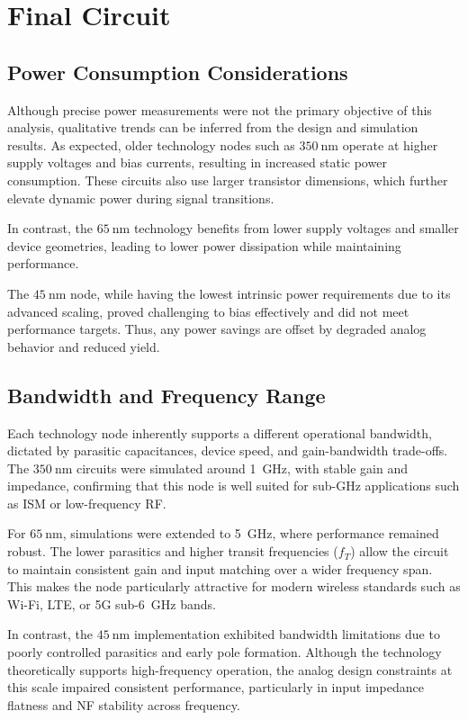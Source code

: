 \section{Final Circuit}

\subsection{Power Consumption Considerations}

Although precise power measurements were not the primary objective of this analysis, qualitative trends can be inferred from the design and simulation results. As expected, older technology nodes such as $\SI{350}{\nano \meter}$ operate at higher supply voltages and bias currents, resulting in increased static power consumption. These circuits also use larger transistor dimensions, which further elevate dynamic power during signal transitions.

In contrast, the $\SI{65}{\nano \meter}$ technology benefits from lower supply voltages and smaller device geometries, leading to lower power dissipation while maintaining performance. 

The $\SI{45}{\nano \meter}$ node, while having the lowest intrinsic power requirements due to its advanced scaling, proved challenging to bias effectively and did not meet performance targets. Thus, any power savings are offset by degraded analog behavior and reduced yield.

\subsection{Bandwidth and Frequency Range}

Each technology node inherently supports a different operational bandwidth, dictated by parasitic capacitances, device speed, and gain-bandwidth trade-offs. The $\SI{350}{\nano \meter}$ circuits were simulated around \SI{1}{\giga\hertz}, with stable gain and impedance, confirming that this node is well suited for sub-GHz applications such as ISM or low-frequency RF.

For $\SI{65}{\nano \meter}$, simulations were extended to \SI{5}{\giga\hertz}, where performance remained robust. The lower parasitics and higher transit frequencies ($f_T$) allow the circuit to maintain consistent gain and input matching over a wider frequency span. This makes the node particularly attractive for modern wireless standards such as Wi-Fi, LTE, or 5G sub-6~GHz bands.

In contrast, the $\SI{45}{\nano \meter}$ implementation exhibited bandwidth limitations due to poorly controlled parasitics and early pole formation. Although the technology theoretically supports high-frequency operation, the analog design constraints at this scale impaired consistent performance, particularly in input impedance flatness and NF stability across frequency.

